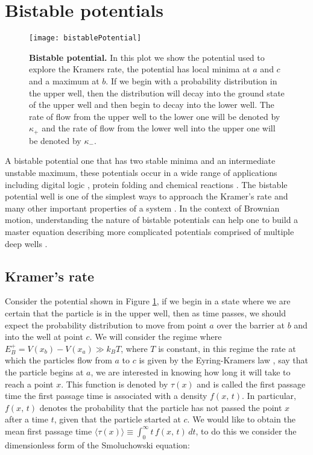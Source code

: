 \section{Bistable potentials} \label{Kramers}

\begin{figure}[tb]
\texttt{[image: bistablePotential]}
\caption{\textbf{Bistable potential.} In this plot we show the potential used to explore the Kramers rate, the potential has local minima at $a$ and $c$ and a maximum at $b$. If we begin with a probability distribution in the upper well, then the distribution will decay into the ground state of the upper well and then begin to decay into the lower well. The rate of flow from the upper well to the lower one will be denoted by $\kappa_+$ and the rate of flow from the lower well into the upper one will be denoted by $\kappa_-$.}
\label{fig:bistablePotential}
\end{figure}

A bistable potential one that has two stable minima and an intermediate unstable maximum, these potentials occur in a wide range of applications including digital logic \cite{MyersCelebranoKrishnan2015}, protein folding \cite{BryngelsonWolynes1989} and chemical reactions \cite{BernePecora1976}. The bistable potential well is one of the simplest ways to approach the Kramer's rate and many other important properties of a system \cite{MyersCelebranoKrishnan2015,Barcilon1996,SantamariaHolekGadomskiRubi2011}. In the context of Brownian motion, understanding the nature of bistable potentials can help one to build a master equation describing more complicated potentials comprised of multiple deep wells \cite{Barcilon1996, ChallisJack2014}. 

\subsection{Kramer's rate}
Consider the potential shown in Figure \ref{fig:bistablePotential}, if we begin in a state where we are certain that the particle is in the upper well, then as time passes, we should expect the probability distribution to move from point $a$ over the barrier at $b$ and into the well at point $c$. We will consider the regime where $E^+_B = V(x_b) - V(x_a) \gg k_B T$, where $T$ is constant, in this regime the rate at which the particles flow from $a$ to $c$ is given by the Eyring-Kramers law \cite{Eyring1935, Kramers1940}, say that the particle begins at $a$, we are interested in knowing how long it will take to reach a point $x$. This function is denoted by $\tau(x)$ and is called the first passage time \cite{Gardiner2009} the first passage time is associated with a density $f(x, \, t)$. In particular, $f(x, \, t)$ denotes the probability that the particle has not passed the point $x$ after a time $t$, given that the particle started at $c$. We would like to obtain the mean first passage time $\langle \tau(x) \rangle \equiv \int_0^{\infty} t \, f(x, \, t) \, dt$, to do this we consider the dimensionless form of the Smoluchowski equation: 

